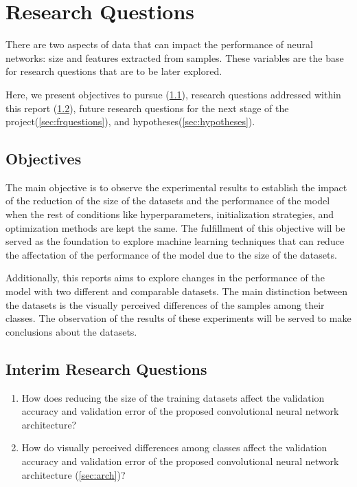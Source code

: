 \documentclass{article}
\begin{document}
\section{Research Questions}
\label{sec:questions}

There are two aspects of data that can impact the performance of neural networks: size and features extracted from samples. These variables are the base for research questions that are to be later explored. 

Here, we present objectives to pursue (\ref{sec:objectives}), research questions addressed within this report (\ref{sec:irquestions}), future research questions for the next stage of the project(\ref{sec:frquestions}), and hypotheses(\ref{sec:hypotheses}).

\subsection{Objectives}
\label{sec:objectives}
The main objective is to observe the experimental results to establish the impact of the reduction of the size of the datasets and the performance of the model when the rest of conditions like hyperparameters, initialization strategies, and optimization methods are kept the same. The fulfillment of this objective will be served as the foundation to explore machine learning techniques that can reduce the affectation of the performance of the model due to the size of the datasets.

Additionally, this reports aims to explore changes in the performance of the model with two different and comparable datasets. The main distinction between the datasets is the visually perceived differences of the samples among their classes. The observation of the results of these experiments will be served to make conclusions about the datasets.

\subsection{Interim Research Questions}
\label{sec:irquestions}

\begin{enumerate}
  \item How does reducing the size of the training datasets affect the validation accuracy and validation error of the proposed convolutional neural network architecture?
    \item How do visually perceived differences among classes affect the validation accuracy and validation error of the proposed convolutional neural network architecture (\ref{sec:arch})?
\end{enumerate}
\end{document}
